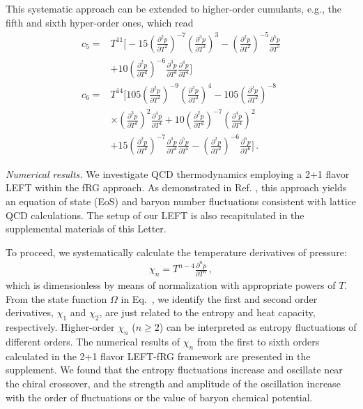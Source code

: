\documentclass[aps,twocolumn,
prl,
superscriptaddress,nofootinbib,floatfix]{revtex4-2}
\begin{document}
This systematic approach can be extended to higher-order cumulants, e.g., the fifth and sixth hyper-order ones, which read
\begin{equation}\label{eq:c56}\begin{split}
    c_5=&T^{11}\Bigg[-15\left(\frac{\partial^2 p}{\partial T^2}\right)^{-7}\left(\frac{\partial^3 p}{\partial T^3}\right)^3-\left(\frac{\partial^2 p}{\partial T^2}\right)^{-5}\frac{\partial^5 p}{\partial T^5}\\[2ex]
    &+10\left(\frac{\partial^2 p}{\partial T^2}\right)^{-6}\frac{\partial^3 p}{\partial T^3}\frac{\partial^4 p}{\partial T^4}\Bigg]\,\\[2ex]
     c_6=&T^{14}\Bigg[105\left(\frac{\partial^2 p}{\partial T^2}\right)^{-9}\left(\frac{\partial^3 p}{\partial T^3}\right)^4-105\left(\frac{\partial^2 p}{\partial T^2}\right)^{-8}\\[2ex]
    &\times\left(\frac{\partial^3 p}{\partial T^3}\right)^2\frac{\partial^4 p}{\partial T^4}+10\left(\frac{\partial^2 p}{\partial T^2}\right)^{-7}\left(\frac{\partial^4 p}{\partial T^4}\right)^2\\[2ex]
    &+15\left(\frac{\partial^2 p}{\partial T^2}\right)^{-7}\frac{\partial^3 p}{\partial T^3}\frac{\partial^5 p}{\partial T^5}-\left(\frac{\partial^2 p}{\partial T^2}\right)^{-6}\frac{\partial^6 p}{\partial T^6}\Bigg]\,.
\end{split} 
\end{equation}


\textit{Numerical results.}\label{sec:numerical} We investigate QCD thermodynamics employing a 2+1 flavor LEFT within the fRG approach. As demonstrated in Ref. \cite{Wen:2018nkn}, this approach yields an equation of state (EoS) and baryon number fluctuations consistent with lattice QCD calculations. The setup of our LEFT is also recapitulated in the supplemental materials of this Letter.

To proceed, we systematically calculate the temperature derivatives of pressure: 
\begin{align}
    \chi_n=T^{n-4}\frac{\partial^n p}{\partial T^n}\,, \label{eq:chi}
\end{align}
which is dimensionless by means of normalization with appropriate powers of $T$. From the state function $\Omega$ in Eq.~, we identify the first and second order derivatives, $\chi_1$ and $\chi_2$, are just related to the entropy and heat capacity, respectively. Higher-order $\chi_n$ ($n \geq 2$) can be interpreted as entropy fluctuations of different orders. The numerical results of $\chi_n$ from the first to sixth orders calculated in the 2+1 flavor LEFT-fRG framework are presented in the supplement. We found that the entropy fluctuations increase and oscillate near the chiral crossover, and the strength and amplitude of the oscillation increase with the order of fluctuations or the value of baryon chemical potential. 
\end{document}
